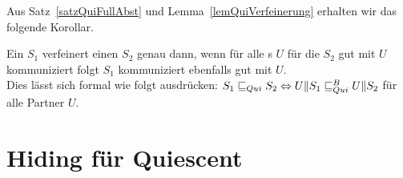 Aus Satz~\ref{satzQuiFullAbst} und Lemma~\ref{lemQuiVerfeinerung} erhalten wir
das folgende Korollar.

\begin{kor}
  Ein \EIO{} $S_1$ verfeinert einen \EIO{} $S_2$ genau dann, wenn für alle
  \EIO{}s $U$ für die $S_2$ gut mit $U$ kommuniziert folgt $S_1$ kommuniziert
  ebenfalls gut mit $U$.\\
  Dies lässt sich formal wie folgt ausdrücken: $S_1\sqsubseteq _{Qui} S_2\Leftrightarrow
  U\|S_1\sqsubseteq _{Qui}^B U\|S_2$ für alle Partner $U$.
\end{kor}

\section{Hiding für Quiescent}
